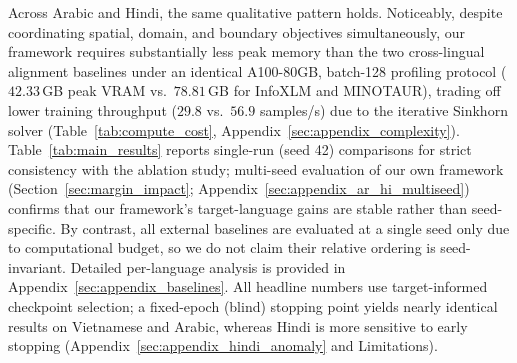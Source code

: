 \documentclass[11pt]{article}
\begin{document}
Across Arabic and Hindi, the same qualitative pattern holds. Noticeably, despite coordinating spatial, domain, and boundary objectives simultaneously, our framework requires substantially less peak memory than the two cross-lingual alignment baselines under an identical A100-80GB, batch-128 profiling protocol ($42.33$\,GB peak VRAM vs.\ $78.81$\,GB for InfoXLM and MINOTAUR), trading off lower training throughput ($29.8$ vs.\ $56.9$ samples/s) due to the iterative Sinkhorn solver (Table~\ref{tab:compute_cost}, Appendix~\ref{sec:appendix_complexity}). Table~\ref{tab:main_results} reports single-run (seed 42) comparisons for strict consistency with the ablation study; multi-seed evaluation of our own framework (Section~\ref{sec:margin_impact}; Appendix~\ref{sec:appendix_ar_hi_multiseed}) confirms that our framework's target-language gains are stable rather than seed-specific. By contrast, all external baselines are evaluated at a single seed only due to computational budget, so we do not claim their relative ordering is seed-invariant. Detailed per-language analysis is provided in Appendix~\ref{sec:appendix_baselines}. All headline numbers use target-informed checkpoint selection; a fixed-epoch (blind) stopping point yields nearly identical results on Vietnamese and Arabic, whereas Hindi is more sensitive to early stopping (Appendix~\ref{sec:appendix_hindi_anomaly} and Limitations).
\end{document}
